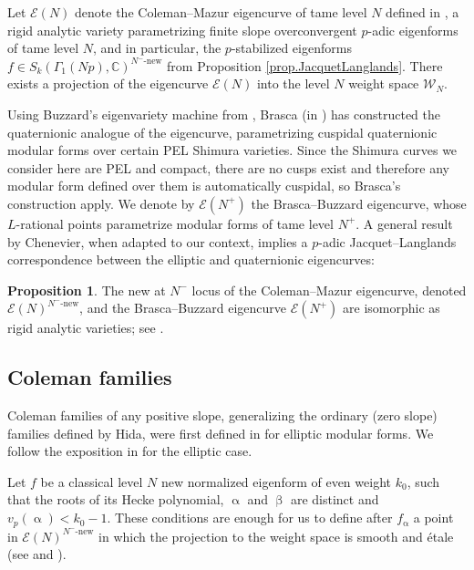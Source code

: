 \documentclass[a4paper]{amsart}
\numberwithin{equation}{section}
\theoremstyle{definition}
\newtheorem{proposition}[theorem]{Proposition}
\newcommand{\C}{\mathbb{C}}
\begin{document}
Let $\mathcal{E}(N)$ denote the Coleman--Mazur eigencurve of tame level $N$ defined in \cite{ColemanMazur}, a rigid analytic variety parametrizing finite slope overconvergent $p$-adic eigenforms of tame level $N$, and in particular, the $p$-stabilized eigenforms $f\in S_k(\Gamma_1(Np),\C)^{N^{-}\text{-new}}$ from Proposition \ref{prop.JacquetLanglands}. There exists a projection of the eigencurve $\mathcal{E}(N)$ into the level $N$ weight space $\mathscr{W}_N$.

Using Buzzard's eigenvariety machine from \cite{Buzzard.Eigen}, Brasca (in \cite{Brasca.Eigenvarieties}) has constructed the quaternionic analogue of the eigencurve, parametrizing cuspidal quaternionic modular forms over certain PEL Shimura varieties. Since the Shimura curves we consider here are PEL and compact, there are no cusps exist and therefore any modular form defined over them is automatically cuspidal, so Brasca's construction apply. We denote by $\mathscr{E}(N^{+})$ the Brasca--Buzzard eigencurve, whose $L$-rational points parametrize modular forms of tame level $N^+$. A general result by Chenevier, when adapted to our context, implies a $p$-adic Jacquet--Langlands correspondence between the elliptic and quaternionic eigencurves:

\begin{proposition}\label{prop.padicJacquetLanglands}
The new at $N^{-}$ locus of the Coleman--Mazur eigencurve, denoted $\mathcal{E}(N)^{N^{-}\text{-new}}$, and the Brasca--Buzzard eigencurve $\mathscr{E}(N^+)$ are isomorphic as rigid analytic varieties; see \cite[Théorème 3]{Chenevier}.
\end{proposition}

\subsection{Coleman families}\label{subsec.ColemanFamilies}
Coleman families of any positive slope, generalizing the ordinary (zero slope) families defined by Hida, were first defined in \cite{Coleman.Banach} for elliptic modular forms. We follow the exposition in \cite[\S 2.2]{NuccioOchiai} for the elliptic case.

Let $f$ be a classical level $N$ new normalized eigenform of even weight $k_0$, such that the roots of its Hecke polynomial, $\upalpha$ and $\upbeta$ are distinct and $v_p(\upalpha)<k_0-1$. These conditions are enough for us to define after $f_\upalpha$ a point in $\mathcal{E}(N)^{N^{-}\text{-new}}$ in which the projection to the weight space is smooth and étale (see \cite[\S 1.1]{Hansen} and \cite[\S 2.3]{Bellaiche}).
\end{document}
